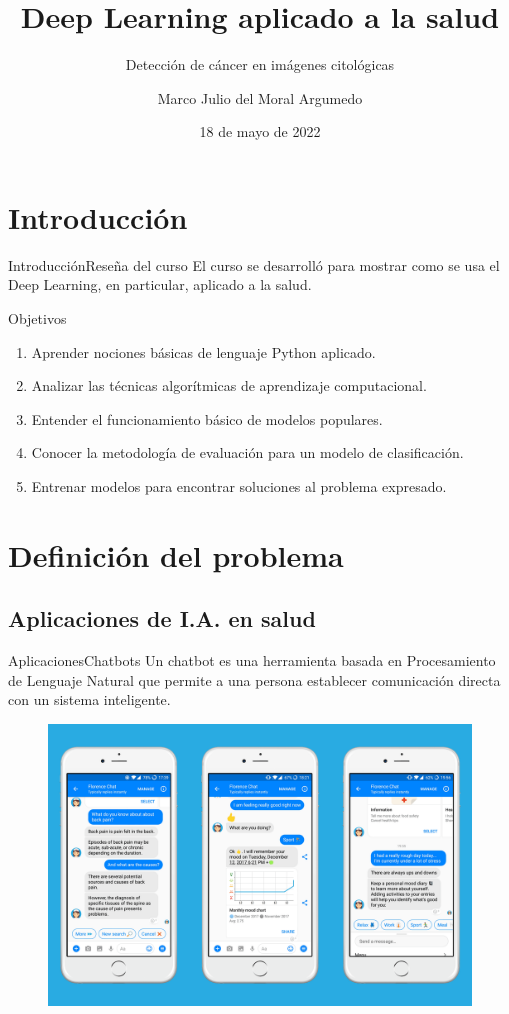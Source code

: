 \documentclass[aspectratio=169,10pt]{beamer}
\title{Deep Learning aplicado a la salud}
\subtitle{Detección de cáncer en imágenes citológicas}
\author[M.I.I Marco del Moral]{Marco Julio del Moral Argumedo}
\institute[ITO]{Tecnológico Nacional de México/Instituto Tecnológico de Orizaba}
\date{18 de mayo de 2022}
\begin{document}
\begin{frame}
  \titlepage
\end{frame}

\section{Introducción}

\begin{frame}{Introducción}{Reseña del curso}
  El curso se desarrolló para mostrar como se usa el Deep Learning, en particular, aplicado a la salud.
  \begin{exampleblock}{Objetivos}
    \begin{enumerate}
      \item Aprender nociones básicas de lenguaje Python aplicado.
      \item Analizar las técnicas algorítmicas de aprendizaje computacional.
      \item Entender el funcionamiento básico de modelos populares.
      \item Conocer la metodología de evaluación para un modelo de clasificación.
      \item Entrenar modelos para encontrar soluciones al problema expresado.
    \end{enumerate}
  \end{exampleblock}
\end{frame}

\section{Definición del problema}

\subsection{Aplicaciones de I.A. en salud}

\begin{frame}{Aplicaciones}{Chatbots}
  Un chatbot es una herramienta basada en Procesamiento de Lenguaje Natural que permite a una persona establecer comunicación directa con un sistema inteligente.
  \begin{figure}[]
    \centering
    \includegraphics[height=0.8\textheight]{chatbot}
  \end{figure}
\end{frame}
\end{document}
